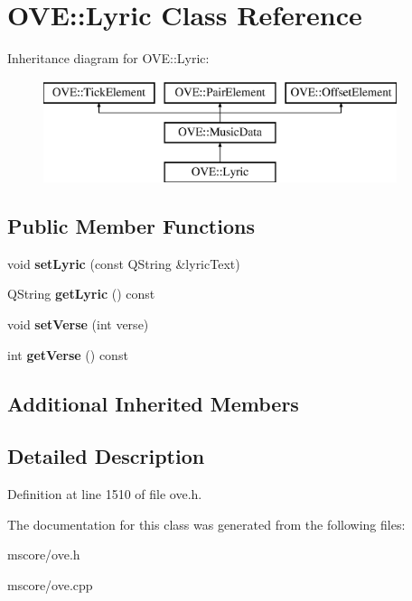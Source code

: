 \hypertarget{class_o_v_e_1_1_lyric}{}\section{O\+VE\+:\+:Lyric Class Reference}
\label{class_o_v_e_1_1_lyric}
Inheritance diagram for O\+VE\+:\+:Lyric\+:\begin{figure}[H]
\begin{center}
\leavevmode
\includegraphics[height=3.000000cm]{class_o_v_e_1_1_lyric}
\end{center}
\end{figure}
\subsection*{Public Member Functions}
\begin{DoxyCompactItemize}
\item 
\mbox{\label{class_o_v_e_1_1_lyric_a06b0d3fb7bef076e98d1e81883171cc1}} 
void {\bfseries set\+Lyric} (const Q\+String \&lyric\+Text)
\item 
\mbox{\label{class_o_v_e_1_1_lyric_aec1e54bad5246224c98beecad09a32a2}} 
Q\+String {\bfseries get\+Lyric} () const
\item 
\mbox{\label{class_o_v_e_1_1_lyric_a08cbb516f00731db19ebfd6cce1a6f71}} 
void {\bfseries set\+Verse} (int verse)
\item 
\mbox{\label{class_o_v_e_1_1_lyric_ab2e91f4eb244e87b094d03a14efff0bb}} 
int {\bfseries get\+Verse} () const
\end{DoxyCompactItemize}
\subsection*{Additional Inherited Members}


\subsection{Detailed Description}


Definition at line 1510 of file ove.\+h.



The documentation for this class was generated from the following files\+:\begin{DoxyCompactItemize}
\item 
mscore/ove.\+h\item 
mscore/ove.\+cpp\end{DoxyCompactItemize}
